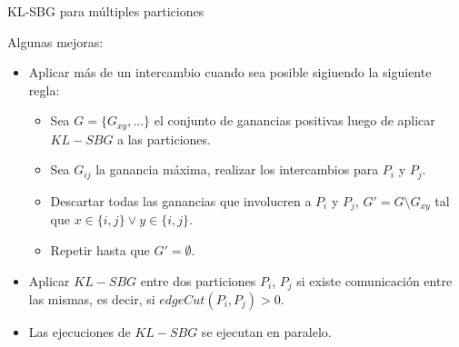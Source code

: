 \begin{frame}{KL-SBG para múltiples particiones}

  Algunas mejoras:

  \begin{itemize}
    \item Aplicar más de un intercambio cuando sea posible sigiuendo la siguiente regla:

    \begin{itemize}
      \item Sea $G = \{G_{xy}, \ldots\}$ el conjunto de ganancias positivas luego de
      aplicar $KL-SBG$ a las particiones.

      \item Sea $G_{ij}$ la ganancia máxima, realizar los intercambios para $P_i$ y $P_j$.

      \item Descartar todas las ganancias que involucren a $P_i$ y $P_j$,
      $G' = G \setminus G_{xy}$ tal que $x \in \{i, j\} \lor y \in \{i,j\}$.

      \item Repetir hasta que $G' = \emptyset$.
    \end{itemize}

  \item Aplicar $KL-SBG$ entre dos particiones $P_i$, $P_j$ si existe comunicación
  entre las mismas, es decir, si $edgeCut(P_i, P_j) > 0$.

  \item Las ejecuciones de $KL-SBG$ se ejecutan en paralelo.
  \end{itemize}

\end{frame}